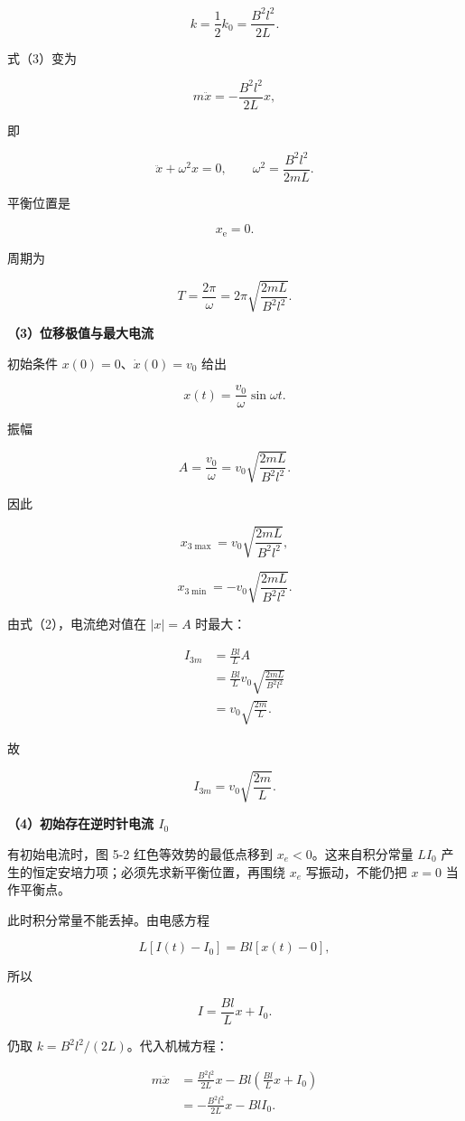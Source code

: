 \documentclass[12pt,a4paper,UTF8]{ctexart}
\begin{document}
\[k=\frac12k_0=\frac{B^2l^2}{2L}. \tag{5}\]

式（3）变为

\[m\ddot x=-\frac{B^2l^2}{2L}x,\]

即

\[\ddot x+\omega^2x=0,\qquad
\omega^2=\frac{B^2l^2}{2mL}. \tag{6}\]

平衡位置是

\[\boxed{x_{\mathrm e}=0}. \tag{7}\]

周期为

\[\boxed{
T=\frac{2\pi}{\omega}
=2\pi\sqrt{\frac{2mL}{B^2l^2}}
}. \tag{8}\]

\textbf{（3）位移极值与最大电流}

初始条件 \(x(0)=0\)、\(\dot x(0)=v_0\) 给出

\[x(t)=\frac{v_0}{\omega}\sin\omega t. \tag{9}\]

振幅

\[A=\frac{v_0}{\omega}
=v_0\sqrt{\frac{2mL}{B^2l^2}}. \tag{10}\]

因此

\[\boxed{x_{3\max}=v_0\sqrt{\frac{2mL}{B^2l^2}}},\]

\[\boxed{x_{3\min}=-v_0\sqrt{\frac{2mL}{B^2l^2}}}. \tag{11}\]

由式（2），电流绝对值在 \(|x|=A\) 时最大：

\[\begin{aligned}
I_{3m}
&=\frac{Bl}{L}A\\
&=\frac{Bl}{L}v_0\sqrt{\frac{2mL}{B^2l^2}}\\
&=v_0\sqrt{\frac{2m}{L}}.
\end{aligned}\]

故

\[\boxed{I_{3m}=v_0\sqrt{\frac{2m}{L}}}. \tag{12}\]

\textbf{（4）初始存在逆时针电流 \(I_0\)}

有初始电流时，图 5-2 红色等效势的最低点移到 \(x_e<0\)。这来自积分常量
\(LI_0\) 产生的恒定安培力项；必须先求新平衡位置，再围绕 \(x_e\)
写振动，不能仍把 \(x=0\) 当作平衡点。

此时积分常量不能丢掉。由电感方程

\[L[I(t)-I_0]=Bl[x(t)-0],\]

所以

\[I=\frac{Bl}{L}x+I_0. \tag{13}\]

仍取 \(k=B^2l^2/(2L)\)。代入机械方程：

\[\begin{aligned}
m\ddot x
&=\frac{B^2l^2}{2L}x
-Bl\left(\frac{Bl}{L}x+I_0\right)\\
&=-\frac{B^2l^2}{2L}x-BlI_0.
\end{aligned}\]
\end{document}
